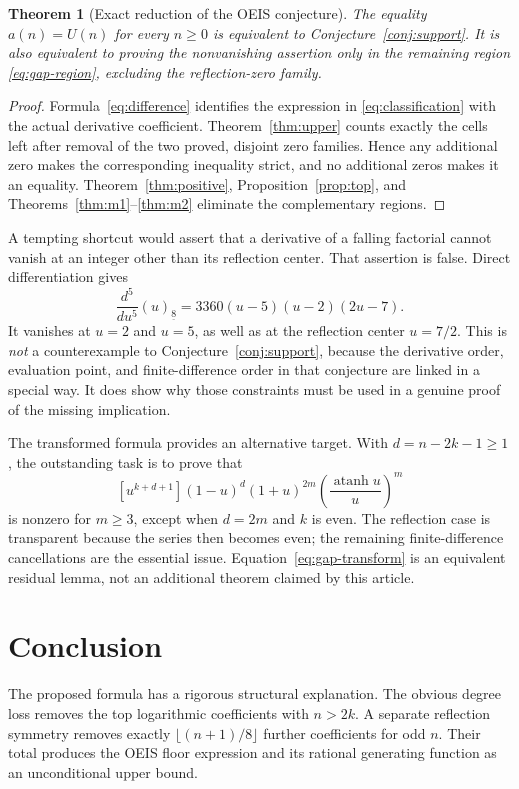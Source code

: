 \documentclass[11pt]{article}
\numberwithin{equation}{section}
\newtheorem{theorem}{Theorem}[section]
\theoremstyle{definition}
\theoremstyle{remark}
\DeclareMathOperator{\atanh}{atanh}
\newcommand{\fall}[2]{(#1)_{\underline{#2}}}
\newcommand{\U}{U}
\begin{document}
\begin{theorem}[Exact reduction of the OEIS conjecture]\label{thm:equivalence}
The equality $a(n)=\U(n)$ for every $n\ge0$ is equivalent to
Conjecture~\ref{conj:support}. It is also equivalent to proving the
nonvanishing assertion only in the remaining region
\eqref{eq:gap-region}, excluding the reflection-zero family.
\end{theorem}
\begin{proof}
Formula~\eqref{eq:difference} identifies the expression in
\eqref{eq:classification} with the actual derivative coefficient.
Theorem~\ref{thm:upper} counts exactly the cells left after removal of the
two proved, disjoint zero families. Hence any additional zero makes the
corresponding inequality strict, and no additional zeros makes it an
equality. Theorem~\ref{thm:positive}, Proposition~\ref{prop:top}, and
Theorems~\ref{thm:m1}--\ref{thm:m2} eliminate the complementary regions.
\end{proof}

A tempting shortcut would assert that a derivative of a falling factorial
cannot vanish at an integer other than its reflection center. That
assertion is false. Direct differentiation gives
\begin{equation}\label{eq:false-shortcut}
 \frac{d^5}{du^5}\fall{u}{8}
 =3360(u-5)(u-2)(2u-7).
\end{equation}
It vanishes at $u=2$ and $u=5$, as well as at the reflection center
$u=7/2$. This is \emph{not} a counterexample to
Conjecture~\ref{conj:support}, because the derivative order, evaluation
point, and finite-difference order in that conjecture are linked in a
special way. It does show why those constraints must be used in a genuine
proof of the missing implication.

The transformed formula provides an alternative target. With
$d=n-2k-1\ge1$, the outstanding task is to prove that
\begin{equation}\label{eq:gap-transform}
 [u^{k+d+1}](1-u)^d(1+u)^{2m}
       \left(\frac{\atanh u}{u}\right)^m
\end{equation}
is nonzero for $m\ge3$, except when $d=2m$ and $k$ is even. The
reflection case is transparent because the series then becomes even;
the remaining finite-difference cancellations are the essential issue.
Equation~\eqref{eq:gap-transform} is an equivalent residual lemma, not an
additional theorem claimed by this article.

\section{Conclusion}
The proposed formula has a rigorous structural explanation. The obvious
degree loss removes the top logarithmic coefficients with $n>2k$.
A separate reflection symmetry removes exactly
$\lfloor(n+1)/8\rfloor$ further coefficients for odd $n$. Their total
produces the OEIS floor expression and its rational generating function
as an unconditional upper bound.
\end{document}
